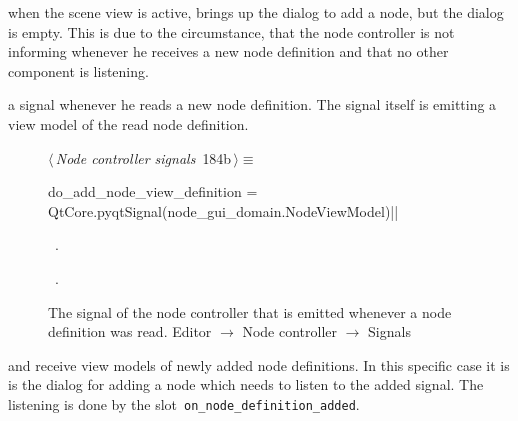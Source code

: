 \documentclass[%
    a4paper,    %
    justified,  %
    nobib,      %
    openany     %
]{tufte-book}
\makeatletter
\renewcommand{\label}[1]{\@tufte@label{##1}}%
\makeatother
\begin{document}
 when the scene view is active, brings up
the dialog to add a node, but the dialog is empty. This is due to the
circumstance, that the node controller is not informing whenever he receives a
new node definition and that no other component is listening.

 a signal whenever he reads a
new node definition. The signal itself is emitting a view model of the read node
definition.

\begin{figure}[!htbp]
\begin{flushleft} \small
\begin{minipage}{\linewidth}\label{scrap158}\raggedright\small
{} $\langle\,${\itshape Node controller signals}\nobreak\ {\footnotesize {184b}}$\,\rangle\equiv$
\vspace{-1ex}
\begin{pythoncode}
do_add_node_view_definition = QtCore.pyqtSignal(node_gui_domain.NodeViewModel)|\NWsep|
\end{pythoncode}
\vspace{1.5ex}
\footnotesize
\begin{list}{}{\setlength{\itemsep}{-\parsep}\setlength{\itemindent}{-\leftmargin}}
\item \NWtxtMacroDefBy\ .
\item \NWtxtMacroRefIn\ .

\item{}
\end{list}
\end{minipage}\vspace{4ex}
\end{flushleft}
\vspace*{-15mm}\caption{The signal of the node controller that is emitted whenever a node
  definition was read.
  \newline{}\newline{}Editor $\rightarrow$ Node controller $\rightarrow$ Signals}
\end{figure}

 and receive view models of newly
added node definitions. In this specific case it is is the dialog for adding a
node which needs to listen to the added signal. The listening is done by the
slot~\verb=on_node_definition_added=.
\end{document}
